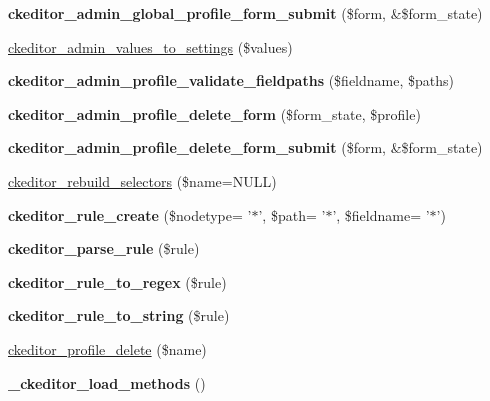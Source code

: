 \begin{CompactItemize}
\item 
\hypertarget{ckeditor_8admin_8inc_c74728948e8e658d2892b1b15af3f413}{
\textbf{ckeditor\_\-admin\_\-global\_\-profile\_\-form\_\-submit} (\$form, \&\$form\_\-state)}
\label{ckeditor_8admin_8inc_c74728948e8e658d2892b1b15af3f413}

\item 
\hyperlink{ckeditor_8admin_8inc_263c86e9cdcf83b608ebfa1bb1bc4933}{ckeditor\_\-admin\_\-values\_\-to\_\-settings} (\$values)
\item 
\hypertarget{ckeditor_8admin_8inc_1a00dc234a3d3192072bfe57f8f4e74c}{
\textbf{ckeditor\_\-admin\_\-profile\_\-validate\_\-fieldpaths} (\$fieldname, \$paths)}
\label{ckeditor_8admin_8inc_1a00dc234a3d3192072bfe57f8f4e74c}

\item 
\hypertarget{ckeditor_8admin_8inc_904b13c59835058166b9b75016f1ce7b}{
\textbf{ckeditor\_\-admin\_\-profile\_\-delete\_\-form} (\$form\_\-state, \$profile)}
\label{ckeditor_8admin_8inc_904b13c59835058166b9b75016f1ce7b}

\item 
\hypertarget{ckeditor_8admin_8inc_f517bed7c249a4a8d670c5ab8cd0aea5}{
\textbf{ckeditor\_\-admin\_\-profile\_\-delete\_\-form\_\-submit} (\$form, \&\$form\_\-state)}
\label{ckeditor_8admin_8inc_f517bed7c249a4a8d670c5ab8cd0aea5}

\item 
\hyperlink{ckeditor_8admin_8inc_5a1fea8aefcc4a105619792d09d3c046}{ckeditor\_\-rebuild\_\-selectors} (\$name=NULL)
\item 
\hypertarget{ckeditor_8admin_8inc_655b3a35a6fc85cc5a13737fd352368f}{
\textbf{ckeditor\_\-rule\_\-create} (\$nodetype= '$\ast$', \$path= '$\ast$', \$fieldname= '$\ast$')}
\label{ckeditor_8admin_8inc_655b3a35a6fc85cc5a13737fd352368f}

\item 
\hypertarget{ckeditor_8admin_8inc_571d0c5ad648ebfd85ebb5d19140911c}{
\textbf{ckeditor\_\-parse\_\-rule} (\$rule)}
\label{ckeditor_8admin_8inc_571d0c5ad648ebfd85ebb5d19140911c}

\item 
\hypertarget{ckeditor_8admin_8inc_d174c34b8e38fb0cbd109cb057905eb6}{
\textbf{ckeditor\_\-rule\_\-to\_\-regex} (\$rule)}
\label{ckeditor_8admin_8inc_d174c34b8e38fb0cbd109cb057905eb6}

\item 
\hypertarget{ckeditor_8admin_8inc_86a41bf6df9ccd16788bafbb59f62613}{
\textbf{ckeditor\_\-rule\_\-to\_\-string} (\$rule)}
\label{ckeditor_8admin_8inc_86a41bf6df9ccd16788bafbb59f62613}

\item 
\hyperlink{ckeditor_8admin_8inc_b3470436270ee64522acd37879ae493f}{ckeditor\_\-profile\_\-delete} (\$name)
\item 
\hypertarget{ckeditor_8admin_8inc_b097792edc0f828c530d51cb4d277cb4}{
\textbf{\_\-ckeditor\_\-load\_\-methods} ()}
\label{ckeditor_8admin_8inc_b097792edc0f828c530d51cb4d277cb4}

\end{CompactItemize}


